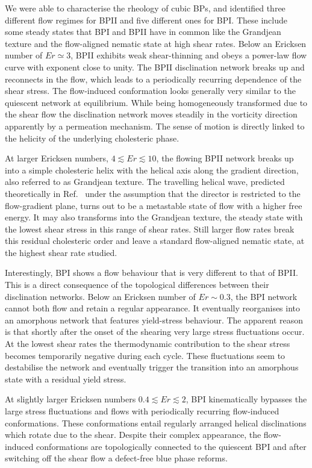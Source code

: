 \documentclass[8.5pt,twoside,twocolumn]{article}
\begin{document}
We were able to characterise the rheology of cubic BPs, and identified 
three different flow regimes for BPII and five different ones for BPI.
These include some steady states that BPI and BPII have in common like the 
Grandjean texture and the flow-aligned nematic state at high shear rates.
Below an Ericksen number of $Er\simeq3$, BPII exhibits weak shear-thinning and 
obeys a power-law flow curve with exponent close to unity.  
The BPII disclination network breaks up and reconnects 
in the flow, which leads to a periodically recurring dependence 
of the shear stress. The flow-induced conformation looks generally
very similar to the quiescent network at equilibrium. 
While being homogeneously transformed due to the shear flow
the disclination network moves steadily in the vorticity direction
apparently by a permeation mechanism. The sense of
motion is directly linked to the helicity of the underlying cholesteric phase.

At larger Ericksen numbers, $4\lesssim Er\lesssim 10$, the flowing BPII network 
breaks up into a simple cholesteric helix with the helical axis 
along the gradient direction, also referred to as Grandjean texture. 
The travelling helical wave, predicted theoretically in Ref.~\cite{Rey:1996a,Rey:1996b}
under the assumption that the director is restricted to the flow-gradient plane,
turns out to be a metastable state of flow with a higher free energy.
It may also transforms into the Grandjean texture, the steady state with the lowest
shear stress in this range of shear rates.
Still larger flow rates break this residual
cholesteric order and leave a standard flow-aligned nematic state,
at the highest shear rate studied.

Interestingly, BPI shows a flow behaviour that is very different to that of BPII.
This is a direct consequence of the topological differences between their disclination 
networks. Below an Ericksen number of $Er\sim 0.3$, the BPI network cannot both flow and 
retain a regular appearance. It eventually reorganises into an amorphous network that
features yield-stress behaviour. The apparent reason is that shortly after the onset of the shearing 
very large stress fluctuations occur. At the lowest shear rates
the thermodynamic contribution to the shear stress becomes temporarily 
negative during each cycle. These fluctuations seem to destabilise the network and 
eventually trigger the transition into an amorphous state with a residual yield
stress. 

At slightly larger Ericksen numbers $0.4\lesssim Er \lesssim2$,
BPI kinematically bypasses the large stress fluctuations and 
flows with periodically recurring flow-induced conformations.
These conformations entail regularly arranged helical disclinations which 
rotate due to the shear. 
Despite their complex appearance, the flow-induced conformations are 
topologically connected to the quiescent BPI and after switching off the 
shear flow a defect-free blue phase reforms.
\end{document}
